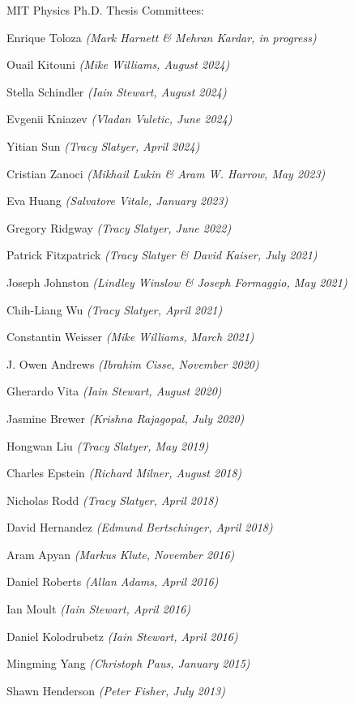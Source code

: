 \bbl

\item MIT Physics Ph.D. Thesis Committees:
\bsbl 
\item Enrique Toloza \textit{(Mark Harnett \& Mehran Kardar, in progress)}
\item Ouail Kitouni \textit{(Mike Williams, August 2024)}
\item Stella Schindler \textit{(Iain Stewart, August 2024)}
\item Evgenii Kniazev \textit{(Vladan Vuletic, June 2024)}
\item Yitian Sun \textit{(Tracy Slatyer, April 2024)}
\item Cristian Zanoci \textit{(Mikhail Lukin \& Aram W. Harrow, May 2023)}
\item Eva Huang \textit{(Salvatore Vitale, January 2023)}
\item Gregory Ridgway \textit{(Tracy Slatyer, June 2022)}
\item Patrick Fitzpatrick \textit{(Tracy Slatyer \& David Kaiser, July 2021)}
\item Joseph Johnston \textit{(Lindley Winslow \& Joseph Formaggio, May 2021)}
\item Chih-Liang Wu \textit{(Tracy Slatyer, April 2021)}
\item Constantin Weisser \textit{(Mike Williams, March 2021)}
\item J. Owen Andrews \textit{(Ibrahim Cisse, November 2020)}
\item Gherardo Vita \textit{(Iain Stewart, August 2020)}
\item Jasmine Brewer \textit{(Krishna Rajagopal, July 2020)}
\item Hongwan Liu \textit{(Tracy Slatyer, May 2019)}
\item Charles Epstein \textit{(Richard Milner, August 2018)}
\item Nicholas Rodd \textit{(Tracy Slatyer, April 2018)}
\item David Hernandez \textit{(Edmund Bertschinger, April 2018)}
\item Aram Apyan \textit{(Markus Klute, November 2016)}
\item Daniel Roberts \textit{(Allan Adams, April 2016)}
\item Ian Moult \textit{(Iain Stewart, April 2016)}
\item Daniel Kolodrubetz \textit{(Iain Stewart, April 2016)}
\item Mingming Yang \textit{(Christoph Paus, January 2015)}
\item Shawn Henderson \textit{(Peter Fisher, July 2013)}
